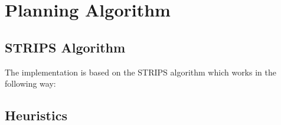 \section{Planning Algorithm}
\label{sec:PlaniAlg}


\subsection{STRIPS Algorithm}
The implementation is based on the STRIPS algorithm which works in the following way:


\subsection{Heuristics}


